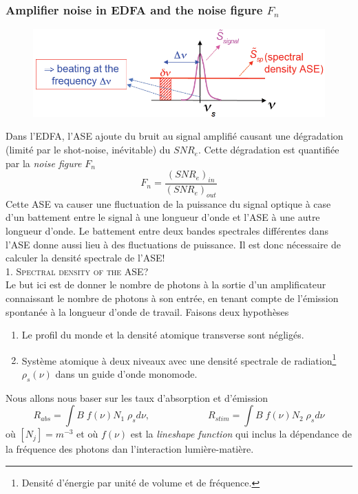 
\newpage
\subsubsection{Amplifier noise in EDFA and the noise figure $F_n$}
	\begin{figure}
	\vspace{-5mm}
	\includegraphics[scale=0.4]{ch6/image10}
	\end{figure}
Dans l'EDFA, l'ASE ajoute du bruit au signal amplifié causant une dégradation (limité par le 
shot-noise, inévitable)  du $SNR_e$. Cette dégradation est quantifiée par la \textit{noise figure}
$F_n$ 
\begin{equation}
{F_n} = \frac{{{{(SN{R_e})}_{in}}}}{{{{(SN{R_e})}_{out}}}}
\end{equation}
Cette ASE va causer une fluctuation de la puissance du signal optique à case d'un battement entre
le signal à une longueur d'onde et l'ASE à une autre longueur d'onde.  Le battement entre deux 
bandes spectrales différentes dans l'ASE donne aussi lieu à des fluctuations de puissance. Il 
est donc nécessaire de calculer la densité spectrale de l'ASE!\\

\textsc{1. Spectral density of the ASE?}\\
Le but ici est de donner le nombre de photons à la sortie d'un amplificateur connaissant le nombre
de photons à son entrée, en tenant compte de l'émission spontanée à la longueur d'onde de travail. 
Faisons deux hypothèses
\begin{enumerate}
\item Le profil du monde et la densité atomique transverse sont négligés.
\item Système atomique à deux niveaux avec une densité spectrale de radiation\footnote{Densité d'énergie par
unité de volume et de fréquence.} $\rho_s(\nu)$ dans un guide d'onde monomode.
\end{enumerate}
Nous allons nous baser sur les taux d'absorption et d'émission
\begin{equation}
{R_{abs}} = \int {B\;f(\nu ){N_1}\;{\rho _s}d\nu },\qquad\qquad\qquad
{R_{stim}} = \int {B\;f(\nu ){N_2}\;{\rho _s}d\nu } 
\end{equation}
où $[N_j] = m^{-3}$ et où $f(\nu)$ est la \textit{lineshape function} qui inclus la dépendance de la 
fréquence des photons dan l'interaction lumière-matière. 


